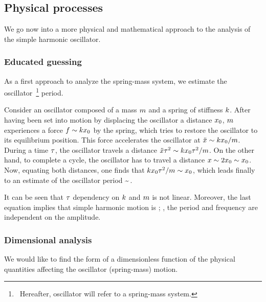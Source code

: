 \subsection{Physical processes}
We go now into a more physical and mathematical approach to the analysis of the simple harmonic oscillator.


\subsubsection{Educated guessing}\label{subsubsec:guessingsimpleoscillator}
As a first approach to analyze the spring-mass system, we estimate the oscillator~\footnote{~Hereafter, oscillator will refer to a spring-mass system.} period.

Consider an oscillator composed of a mass $m$ and a spring of stiffness $k$. After having been set into motion by displacing the oscillator a distance $x_0$, $m$ experiences a force $f\sim kx_0$ by the spring, which tries to restore the oscillator to its equilibrium position. This force accelerates the oscillator at $\ddot{x}\sim kx_0/m$. During a time $\tau$, the oscillator travels a distance $\ddot{x}\tau^2\sim kx_0\tau^2/m$. On the other hand, to complete a cycle, the oscillator has to travel a distance $x\sim 2x_0\sim x_0$. Now, equating both distances, one finds that $kx_0\tau^2/m\sim x_0$, which leads finally to an estimate of the oscillator period
\beq
\oper\sim\sqrt{\dfrac{\mass}{\kspring}}\,.
\eeq

It can be seen that $\tau$ dependency on $k$ and $m$ is not linear. Moreover, the last equation implies that simple harmonic motion is ; \ie, the period and frequency are independent on the amplitude.


\subsubsection{Dimensional analysis}
We would like to find the form of a dimensionless function of the physical quantities affecting the oscillator (spring-mass) motion.

